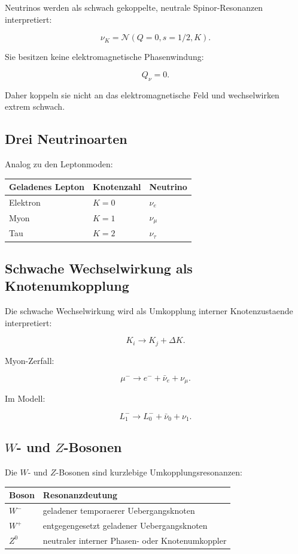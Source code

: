 \documentclass[11pt,a4paper]{article}
\begin{document}
Neutrinos werden als schwach gekoppelte, neutrale Spinor-Resonanzen interpretiert:

\[
\nu_K = \mathcal{N}(Q=0,s=1/2,K).
\]

Sie besitzen keine elektromagnetische Phasenwindung:

\[
Q_\nu = 0.
\]

Daher koppeln sie nicht an das elektromagnetische Feld und wechselwirken extrem schwach.

\subsection{Drei Neutrinoarten}

Analog zu den Leptonmoden:

\begin{longtable}{>{\raggedright\arraybackslash}p{4cm}p{4cm}p{4cm}}
\toprule
Geladenes Lepton & Knotenzahl & Neutrino \\
\midrule
Elektron & $K=0$ & $\nu_e$ \\
Myon & $K=1$ & $\nu_\mu$ \\
Tau & $K=2$ & $\nu_\tau$ \\
\bottomrule
\end{longtable}

\subsection{Schwache Wechselwirkung als Knotenumkopplung}

Die schwache Wechselwirkung wird als Umkopplung interner Knotenzustaende interpretiert:

\[
K_i \rightarrow K_j+\Delta K.
\]

Myon-Zerfall:

\[
\mu^- \rightarrow e^-+\bar{\nu}_e+\nu_\mu.
\]

Im Modell:

\[
L_1^- \rightarrow L_0^-+\bar{\nu}_0+\nu_1.
\]

\subsection{$W$- und $Z$-Bosonen}

Die $W$- und $Z$-Bosonen sind kurzlebige Umkopplungsresonanzen:
\begin{longtable}{>{\raggedright\arraybackslash}p{3cm}p{10cm}}
\toprule
Boson & Resonanzdeutung \\
\midrule
$W^-$ & geladener temporaerer Uebergangsknoten \\
$W^+$ & entgegengesetzt geladener Uebergangsknoten \\
$Z^0$ & neutraler interner Phasen- oder Knotenumkoppler \\
\bottomrule
\end{longtable}
\end{document}

